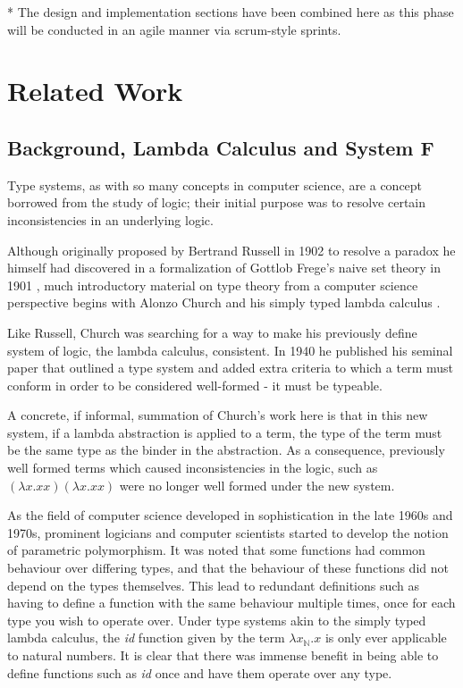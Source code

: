 \documentclass{ProgressReport}[2020/09/15]
\begin{document}
        * The design and implementation sections have been combined
        here as this phase will be conducted in an agile manner via
        scrum-style sprints.
        
        \chapter{Related Work}

        \section{Background, Lambda Calculus and System F}

          Type systems, as with so many concepts in computer science,
          are a concept borrowed from the study of logic; their initial
          purpose was to resolve certain inconsistencies in an
          underlying logic. 
      
          Although originally proposed by Bertrand Russell in 1902 to
          resolve a paradox he himself had discovered in a formalization of
          Gottlob Frege's naive set theory in 1901 \cite{Russell1901}, much
          introductory material on type theory from a computer science
          perspective begins with Alonzo Church and his simply typed
          lambda calculus \cite{church1940}.
          
          Like Russell, Church was searching for a way to make his
          previously define system of logic, the lambda calculus,
          consistent. In 1940 he published his seminal paper that outlined a
          type system and added extra criteria to which a term must
          conform in order to be considered well-formed - it must be typeable.
      
          A concrete, if informal, summation of Church's work here is that
          in this new system, if a lambda abstraction is applied to a term,
          the type of the term must be the same type as the binder in the
          abstraction. As a consequence, previously well formed terms which
          caused inconsistencies in the logic, such as
          $ (\lambda x.xx)(\lambda x.xx)  $
          were no longer well formed under the new system.
      
          As the field of computer science developed in sophistication in
          the late 1960s and 1970s, prominent logicians and computer
          scientists started to develop the notion of parametric
          polymorphism. It was noted that some functions had common
          behaviour over differing types, and that the behaviour of these
          functions did not depend on the types themselves. This lead to
          redundant definitions such as having to define a function with the
          same behaviour multiple times, once for each type you wish to
          operate over. Under type systems akin to the simply typed lambda
          calculus, the \emph{id} function given by the term $\lambda
          x_{\mathbb{N}}.x $ is only ever applicable to natural numbers. It
          is clear that there was immense benefit in being able to define
          functions such as \emph{id} once and have them operate over any type.
      
\end{document}
